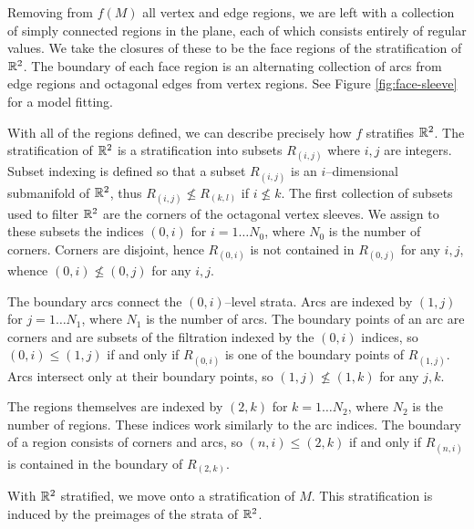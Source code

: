 Removing from $f(M)$ all vertex and edge regions, we are left with a collection of simply connected regions in the plane, each of which consists entirely of regular values.
We take the closures of these to be the face regions of the stratification of $\mathbb{R}^2$.
The boundary of each face region is an alternating collection of arcs from edge regions and octagonal edges from vertex regions.
See Figure \ref{fig:face-sleeve} for a model fitting.

With all of the regions defined, we can describe precisely how $f$ stratifies $\mathbb{R}^2$.
The stratification of $\mathbb{R}^2$ is a stratification into subsets $R_{(i,j)}$ where $i,j$ are integers.
Subset indexing is defined so that a subset $R_{(i,j)}$ is an $i$--dimensional submanifold of $\mathbb{R}^2$, thus $R_{(i,j)}\nleq R_{(k,l)}$ if $i\nleq k$.
The first collection of subsets used to filter $\mathbb{R}^2$ are the corners of the octagonal vertex sleeves.
We assign to these subsets the indices $(0,i)$ for $i=1\dots N_0$, where $N_0$ is the number of corners.
Corners are disjoint, hence $R_{(0,i)}$ is not contained in $R_{(0,j)}$ for any $i, j$, whence $(0,i)\nleq (0,j)$ for any $i,j$.

The boundary arcs connect the $(0,i)$--level strata.
Arcs are indexed by $(1,j)$ for $j=1\dots N_1$, where $N_1$ is the number of arcs.
The boundary points of an arc are corners and are subsets of the filtration indexed by the $(0,i)$ indices, so $(0,i)\leq (1,j)$ if and only if $R_{(0,i)}$ is one of the boundary points of $R_{(1,j)}$.
Arcs intersect only at their boundary points, so $(1,j)\nleq(1,k)$ for any $j,k$. 

The regions themselves are indexed by $(2,k)$ for $k=1\dots N_2$, where $N_2$ is the number of regions.
These indices work similarly to the arc indices.
The boundary of a region consists of corners and arcs, so $(n,i)\leq(2,k)$ if and only if $R_{(n,i)}$ is contained in the boundary of $R_{(2,k)}$.

With $\mathbb{R}^2$ stratified, we move onto a stratification of $M$.
This stratification is induced by the preimages of the strata of $\mathbb{R}^2$.

%
%
%
%

